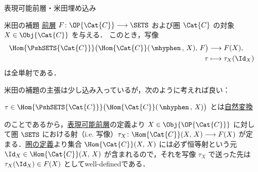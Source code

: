 \documentclass[TQFT_main]{subfiles}
\begin{document}
\begin{mydef}[label=def:representable,breakable]{表現可能前層・米田埋め込み}
\begin{itemize}
\begin{itemize}
        \end{itemize}
        
    \end{itemize}
    
\end{mydef}

\begin{mylem}[label=lem:Yoneda]{米田の補題}
    \hyperref[def:presheaf-general]{前層} $F \colon \OP{\Cat{C}} \lto \SETS$ および圏 $\Cat{C}$ の対象 $X \in \Obj{\Cat{C}}$ を与える．
    このとき，写像
    \begin{align}
        \Hom{\PshSETS{\Cat{C}}}\bigl( \Hom{\Cat{C}}(\, \mhyphen\,,\, X),\, F \bigr) &\lto F(X), \\
        \tau &\lmto \tau_X(\Id_X)
    \end{align}
    は全単射である．
\end{mylem}

米田の補題の主張は少し込み入っているが，次のように考えれば良い：

$\tau \in \Hom{\PshSETS{\Cat{C}}}\bigl( \Hom{\Cat{C}}(\, \mhyphen\,,\, X)\bigr)$ とは\hyperref[def:nat]{自然変換}
\begin{center}
\end{center}
のことであるから，\hyperref[def:representable]{表現可能前層}の定義より $X \in \Obj{\OP{\Cat{C}}}$ に対して圏 $\SETS$ における射（i.e. 写像）$\tau_X \colon \Hom{\Cat{C}}(X,\, X) \lto F(X)$ が定まる．\hyperref[def:category]{圏の定義}より集合 $\Hom{\Cat{C}}(X,\, X)$ には必ず恒等射という元 $\Id_X \in \Hom{\Cat{C}}(X,\, X)$ が含まれるので，それを写像 $\tau_X$ で送った先は $\tau_X(\Id_X) \in F(X)$ としてwell-definedである．
\end{document}
